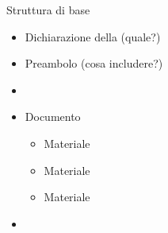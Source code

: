 \documentclass{beamer}
\subtitle{Parte 4: Scrivere una tesi di laurea con Latex}
\begin{document}
\begin{frame}
\titlepage
\end{frame}

\begin{frame}{Struttura di base}
\begin{itemize}
\item Dichiarazione della  (quale?)
\item Preambolo (cosa includere?)
\item {}
\item Documento
\begin{itemize}
\item Materiale 
\item Materiale 
\item Materiale 
\end{itemize}
\item {}
\end{itemize}
\end{frame}
\end{document}
